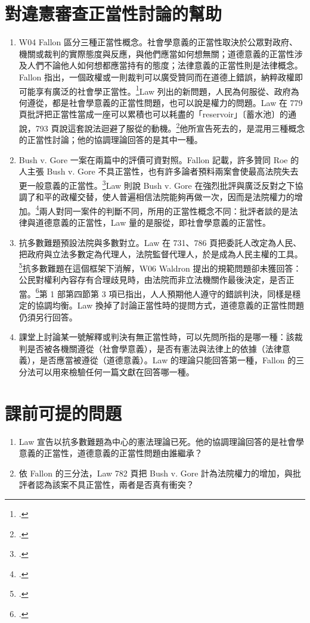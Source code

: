 \section{對違憲審查正當性討論的幫助}
\label{sec:50_theory-3}

\begin{enumerate}
\tightlist
\item
  W04 Fallon 區分三種正當性概念。社會學意義的正當性取決於公眾對政府、機關或裁判的實際態度與反應，與他們應當如何想無關；道德意義的正當性涉及人們不論他人如何想都應當持有的態度；法律意義的正當性則是法律概念。Fallon 指出，一個政權或一則裁判可以廣受贊同而在道德上錯誤，納粹政權即可能享有廣泛的社會學正當性。\footcite[21--22]{fallon2018}Law 列出的新問題，人民為何服從、政府為何遵從，都是社會學意義的正當性問題，也可以說是權力的問題。Law 在 779 頁批評把正當性當成一座可以累積也可以耗盡的「reservoir」〔蓄水池〕的通說，793 頁說這套說法迴避了服從的動機。\footcite[779, 793]{law2009}他所宣告死去的，是混用三種概念的正當性討論；他的協調理論回答的是其中一種。
\item
  Bush v. Gore 一案在兩篇中的評價可資對照。Fallon 記載，許多贊同 Roe 的人主張 Bush v. Gore 不具正當性，也有許多論者預料兩案會使最高法院失去更一般意義的正當性。\footcite[20--21]{fallon2018}Law 則說 Bush v. Gore 在強烈批評與廣泛反對之下協調了和平的政權交替，使人普遍相信法院能夠再做一次，因而是法院權力的增加。\footcite[782]{law2009}兩人對同一案件的判斷不同，所用的正當性概念不同：批評者談的是法律與道德意義的正當性，Law 量的是服從，即社會學意義的正當性。
\item
  抗多數難題預設法院與多數對立。Law 在 731、786 頁把委託人改定為人民、把政府與立法多數定為代理人，法院監督代理人，於是成為人民主權的工具。\footcite[731, 786]{law2009}抗多數難題在這個框架下消解，W06 Waldron 提出的規範問題卻未獲回答：公民對權利內容存有合理歧見時，由法院而非立法機關作最後決定，是否正當。\footcite{waldron2006}第 1 部第四節第 3 項已指出，人人預期他人遵守的錯誤判決，同樣是穩定的協調均衡。Law 換掉了討論正當性時的提問方式，道德意義的正當性問題仍須另行回答。
\item
  課堂上討論某一號解釋或判決有無正當性時，可以先問所指的是哪一種：該裁判是否被各機關遵從（社會學意義），是否有憲法與法律上的依據（法律意義），是否應當被遵從（道德意義）。Law 的理論只能回答第一種，Fallon 的三分法可以用來檢驗任何一篇文獻在回答哪一種。
\end{enumerate}

\section{課前可提的問題}
\label{sec:50_theory-4}

\begin{enumerate}
\tightlist
\item Law 宣告以抗多數難題為中心的憲法理論已死。他的協調理論回答的是社會學意義的正當性，道德意義的正當性問題由誰繼承？
\item 依 Fallon 的三分法，Law 782 頁把 Bush v. Gore 計為法院權力的增加，與批評者認為該案不具正當性，兩者是否真有衝突？
\end{enumerate}
